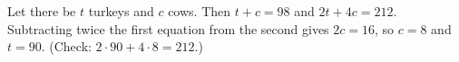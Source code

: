 Let there be $t$ turkeys and $c$ cows. Then $t+c=98$ and $2t+4c=212$. Subtracting twice the first equation from the second gives $2c=16$, so $c=8$ and $t=\boxed{90}$. (Check: $2\cdot90+4\cdot8=212$.)
